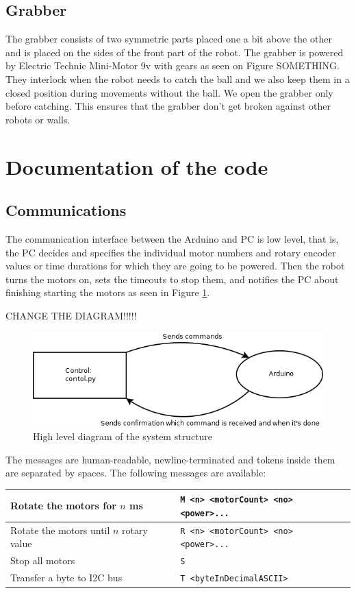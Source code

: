 \documentclass[12pt]{article}
\begin{document}
\subsection{Grabber}
The grabber consists of two symmetric parts placed one a bit above the other and is placed on the sides of the front part of the robot. The grabber is powered by Electric Technic Mini-Motor 9v with gears as seen on Figure SOMETHING. They interlock when the robot needs to catch the ball and we also keep them in a closed position during movements without the ball. We open the grabber only before catching. This ensures that the grabber don't get broken against other robots or walls.  

\section{Documentation of the code}

\subsection{Communications}

The communication interface between the Arduino and PC is low level, that is,
the PC decides and specifies the individual motor numbers and rotary encoder
values or time durations for which they are going to be powered. Then the robot
turns the motors on, sets the timeouts to stop them, and notifies the PC about
finishing starting the motors as seen in Figure \ref{fig:code1}.

CHANGE THE DIAGRAM!!!!!
\begin{figure}
    \includegraphics[scale=.7]{Diagram2}
    \caption{High level diagram of the system structure}
    \label{fig:code1}
\end{figure}

The messages are human-readable, newline-terminated and tokens inside them are
separated by spaces. The following messages are available:

\begin{tabular}{ | l | l | }
    \hline
    Rotate the motors for $n$ ms &
    \texttt{M <n> <motorCount> <no> <power>...} \\ \hline
    Rotate the motors until $n$ rotary value &
    \texttt{R <n> <motorCount> <no> <power>...} \\ \hline
    Stop all motors &
    \texttt{S} \\ \hline
    Transfer a byte to I2C bus &
    \texttt{T <byteInDecimalASCII>} \\ \hline
\end{tabular}
\end{document}

